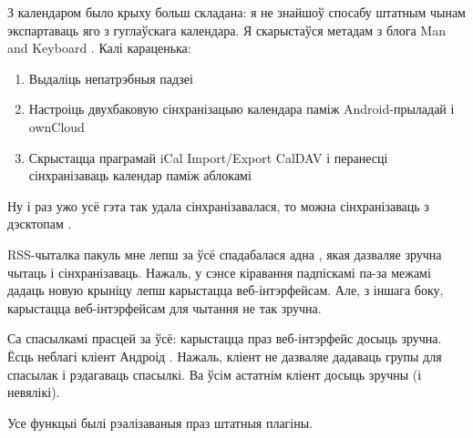 \documentclass[10pt, a5paper]{article}
\begin{document}
З календаром было крыху больш складана: я не знайшоў спосабу штатным чынам экспартаваць яго з гуглаўскага календара. Я скарыстаўся метадам з блога Man and Keyboard \cite{zahar9}. Калі караценька:

\begin{enumerate}
  \item Выдаліць непатрэбныя падзеі
  \item Настроіць двухбаковую сінхранізацыю календара паміж Android-прыладай і ownCloud
  \item Скрыстацца праграмай iCal Import/Export CalDAV \cite{zahar10} і перанесці сінхранізаваць календар паміж аблокамі
\end{enumerate}

Ну і раз ужо усё гэта так удала сінхранізавалася, то можна сінхранізаваць з дэсктопам \cite{zahar12, zahar13}.

RSS-чыталка пакуль мне лепш за ўсё спадабалася адна  \cite{zahar14}, якая дазваляе зручна чытаць і сінхранізаваць. Нажаль, у сэнсе кіравання падпіскамі па-за межамі дадаць новую крыніцу лепш карыстацца веб-інтэрфейсам. Але, з іншага боку, карыстацца веб-інтэрфейсам для чытання не так зручна.

Са спасылкамі прасцей за ўсё: карыстацца праз веб-інтэрфейс досыць зручна. Ёсць неблагі кліент Андроід \cite{zahar15}. Нажаль, кліент не дазваляе дадаваць групы для спасылак і рэдагаваць спасылкі. Ва ўсім астатнім кліент досыць зручны (і невялікі).

Усе функцыі былі рэалізаваныя праз штатныя плагіны.
\end{document}
